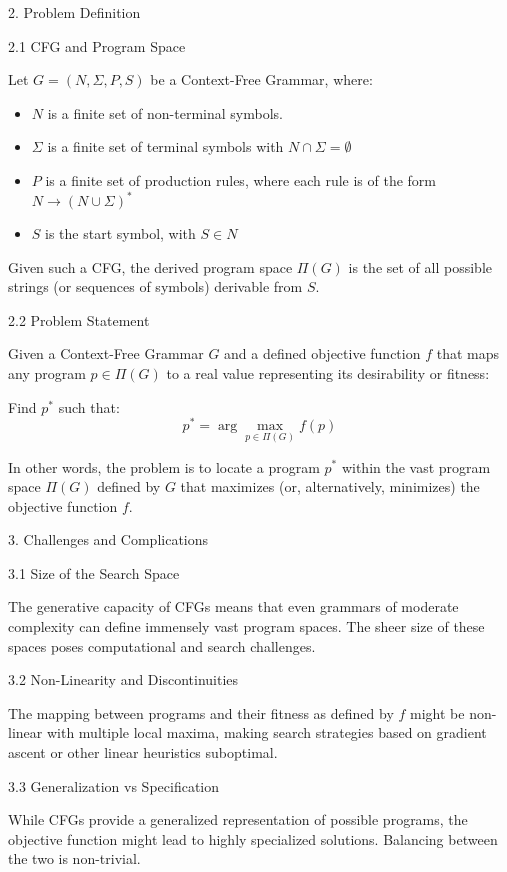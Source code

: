 2. Problem Definition

2.1 CFG and Program Space

Let \( G = (N, \Sigma, P, S) \) be a Context-Free Grammar, where:
\begin{itemize}
    \item \( N \) is a finite set of non-terminal symbols.
    \item \( \Sigma \) is a finite set of terminal symbols with \newline \( N \cap \Sigma = \emptyset \)
    \item \( P \) is a finite set of production rules, where each rule is of the form \( N \rightarrow (N \cup \Sigma)^* \)
    \item \( S \) is the start symbol, with \( S \in N \)
\end{itemize}

Given such a CFG, the derived program space \( \Pi(G) \) is the set of all possible strings (or sequences of symbols) derivable from \( S \).

2.2 Problem Statement

Given a Context-Free Grammar \( G \) and a defined objective function \( f \) that maps any program \( p \in \Pi(G) \) to a real value representing its desirability or fitness:

Find \( p^* \) such that:
\[ p^* = \arg\max_{p \in \Pi(G)} f(p) \]

In other words, the problem is to locate a program \( p^* \) within the vast program space \( \Pi(G) \) defined by \( G \) that maximizes (or, alternatively, minimizes) the objective function \( f \).

3. Challenges and Complications

3.1 Size of the Search Space

The generative capacity of CFGs means that even grammars of moderate complexity can define immensely vast program spaces. The sheer size of these spaces poses computational and search challenges.

3.2 Non-Linearity and Discontinuities

The mapping between programs and their fitness as defined by \( f \) might be non-linear with multiple local maxima, making search strategies based on gradient ascent or other linear heuristics suboptimal.

3.3 Generalization vs Specification

While CFGs provide a generalized representation of possible programs, the objective function might lead to highly specialized solutions. Balancing between the two is non-trivial.

